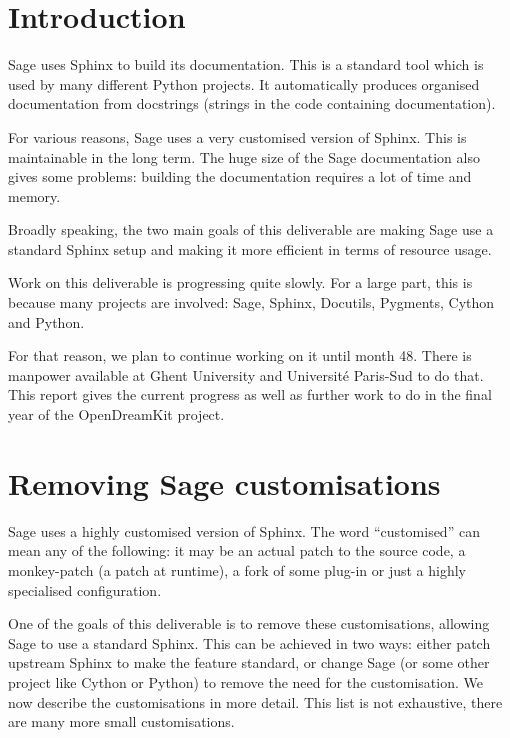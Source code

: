 \documentclass{deliverablereport}
\author{Jeroen Demeyer}
\begin{document}
\maketitle
\tableofcontents


\section{Introduction}

Sage uses Sphinx to build its documentation.
This is a standard tool which is used by many different Python projects.
It automatically produces organised documentation from docstrings
(strings in the code containing documentation).

For various reasons, Sage uses a very customised version of Sphinx.
This is maintainable in the long term.
The huge size of the Sage documentation also gives
some problems: building the documentation requires a lot of time and memory.

Broadly speaking, the two main goals of this deliverable are
making Sage use a standard Sphinx setup
and making it more efficient in terms of resource usage.

Work on this deliverable is progressing quite slowly.
For a large part, this is because many projects are involved:
Sage, Sphinx, Docutils, Pygments, Cython and Python.

For that reason, we plan to continue working on it until month 48.
There is manpower available at Ghent University and Universit\'e Paris-Sud to do that.
This report gives the current progress
as well as further work to do in the final year of the OpenDreamKit project.

\section{Removing Sage customisations}

Sage uses a highly customised version of Sphinx.
The word ``customised'' can mean any of the following:
it may be an actual patch to the source code,
a monkey-patch (a patch at runtime),
a fork of some plug-in or just a highly specialised configuration.

One of the goals of this deliverable is to remove these
customisations, allowing Sage to use a standard Sphinx.
This can be achieved in two ways:
either patch upstream Sphinx to make the feature standard,
or change Sage (or some other project like Cython or Python)
to remove the need for the customisation.
We now describe the customisations in more detail.
This list is not exhaustive, there are many more small
customisations.
\end{document}

